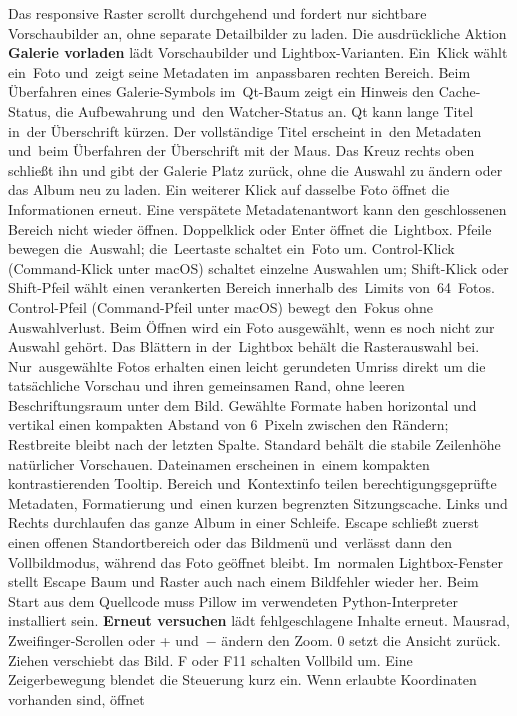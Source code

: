 \documentclass[11pt,a4paper]{article}
\newcommand{\ui}[1]{\textbf{#1}}
\begin{document}
Das responsive Raster scrollt durchgehend und fordert nur sichtbare
Vorschaubilder an, ohne separate Detailbilder zu laden. Die ausdrückliche Aktion
\ui{Galerie vorladen} lädt Vorschaubilder und Lightbox-Varianten. Ein~Klick wählt
ein~Foto und~zeigt seine Metadaten im~anpassbaren rechten Bereich.
Beim Überfahren eines Galerie-Symbols im~Qt-Baum zeigt ein Hinweis den
Cache-Status, die Aufbewahrung und~den Watcher-Status an.
Qt kann lange Titel in~der Überschrift kürzen. Der vollständige Titel erscheint
in~den Metadaten und~beim Überfahren der Überschrift mit der Maus.
Das Kreuz rechts oben schließt ihn und gibt der Galerie Platz zurück, ohne
die Auswahl zu ändern oder das Album neu zu laden. Ein weiterer Klick auf
dasselbe Foto öffnet die Informationen erneut. Eine verspätete Metadatenantwort
kann den geschlossenen Bereich nicht wieder öffnen.
Doppelklick oder Enter öffnet die~Lightbox. Pfeile bewegen die~Auswahl;
die~Leertaste schaltet ein~Foto um. Control-Klick (Command-Klick unter macOS)
schaltet einzelne Auswahlen um; Shift-Klick oder Shift-Pfeil wählt einen
verankerten Bereich innerhalb des~Limits von~64~Fotos.
Control-Pfeil (Command-Pfeil unter macOS) bewegt den~Fokus ohne Auswahlverlust.
Beim Öffnen wird ein Foto ausgewählt, wenn es noch nicht zur Auswahl gehört.
Das Blättern in der~Lightbox behält die Rasterauswahl bei.
Nur~ausgewählte Fotos erhalten einen leicht gerundeten Umriss direkt um die
tatsächliche Vorschau und ihren gemeinsamen Rand, ohne leeren Beschriftungsraum
unter dem Bild. Gewählte Formate haben horizontal und vertikal einen kompakten
Abstand von 6~Pixeln zwischen den Rändern; Restbreite bleibt nach der letzten
Spalte. Standard behält die stabile Zeilenhöhe natürlicher Vorschauen. Dateinamen
erscheinen in~einem kompakten kontrastierenden Tooltip. Bereich und~Kontextinfo
teilen berechtigungsgeprüfte Metadaten, Formatierung und~einen kurzen
begrenzten Sitzungscache.
Links und Rechts durchlaufen das ganze Album in einer Schleife. Escape schließt
zuerst einen offenen Standortbereich oder das Bildmenü und~verlässt dann den
Vollbildmodus, während das Foto geöffnet bleibt. Im~normalen Lightbox-Fenster
stellt Escape Baum und Raster auch nach einem Bildfehler wieder her.
Beim Start aus dem Quellcode muss
Pillow im verwendeten Python-Interpreter installiert sein.
\ui{Erneut versuchen} lädt fehlgeschlagene Inhalte erneut. Mausrad,
Zweifinger-Scrollen oder + und~\ensuremath{-} ändern den Zoom. 0 setzt die Ansicht zurück.
Ziehen verschiebt das Bild. F oder F11 schalten Vollbild um. Eine
Zeigerbewegung blendet die Steuerung kurz ein.
Wenn erlaubte Koordinaten vorhanden sind, öffnet
\end{document}
